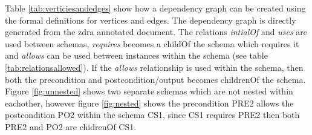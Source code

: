 
Table \ref{tab:verticiesandedges} show how a dependency graph can be created
using the formal definitions for vertices and edges. The dependency graph is
directly generated from the \gls{zdra} annotated document. The relations
\emph{intialOf} and \emph{uses} are used between schemas, \emph{requires}
becomes a childOf the schema which requires it and \emph{allows} can be used
between instances within the schema (see table \ref{tab:relationsallowed}). If
the \emph{allows} relationship is used within the schema, then both the
precondition and postcondition/output becomes childrenOf the schema. Figure
\ref{fig:unnested} shows two separate schemas which are not nested within
eachother, however figure \ref{fig:nested} shows the precondition PRE2 allows
the postcondition PO2 within the schema CS1, since CS1 requires PRE2 then both
PRE2 and PO2 are chidrenOf CS1.

